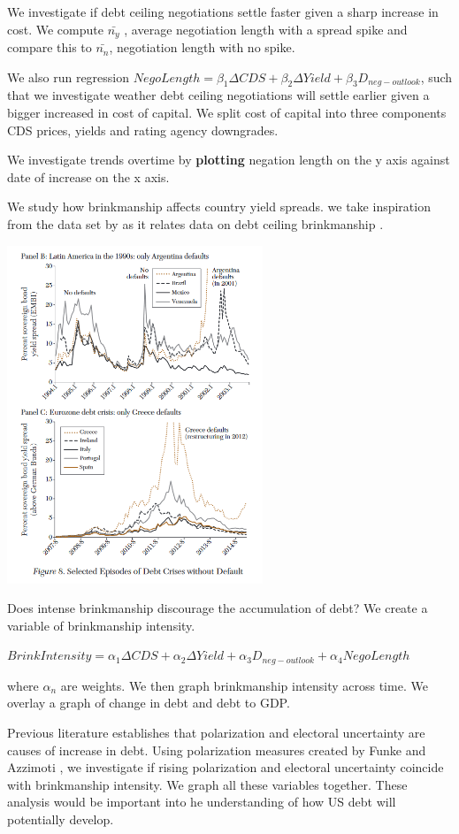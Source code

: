 \documentclass[
  12pt]{article}
\begin{document}
We investigate if debt ceiling negotiations settle faster given a sharp
increase in cost. We compute \(\bar{n_{y}}\) , average negotiation
length with a spread spike and compare this to \(\bar{n_{n}}\),
negotiation length with no spike.

We also run regression
\(NegoLength=\beta_1\Delta CDS+\beta_2\Delta Yield+\beta_3D_{neg-outlook}\),
such that we investigate weather debt ceiling negotiations will settle
earlier given a bigger increased in cost of capital. We split cost of
capital into three components CDS prices, yields and rating agency
downgrades.

We investigate trends overtime by \textbf{plotting} negation length on
the y axis against date of increase on the x axis.

We study how brinkmanship affects country yield spreads. we take
inspiration from the data set by \citep{meyer2022} as it relates data on
debt ceiling brinkmanship \citep{reinhart2008}.

\includegraphics[width=3.01042in,height=\textheight]{style-guide/overtime_brink_2.png}

Does intense brinkmanship discourage the accumulation of debt? We create
a variable of brinkmanship intensity.

\(BrinkIntensity=\alpha_1\Delta CDS+\alpha_2\Delta Yield+\alpha_3D_{neg-outlook}+\alpha_4NegoLength\)

where \(\alpha_n\) are weights. We then graph brinkmanship intensity
across time. We overlay a graph of change in debt and debt to GDP.

Previous literature establishes that polarization and electoral
uncertainty are causes of increase in debt. Using polarization measures
created by Funke and Azzimoti \citep{funke2016, azzimonti2018}, we
investigate if rising polarization and electoral uncertainty coincide
with brinkmanship intensity. We graph all these variables together.
These analysis would be important into he understanding of how US debt
will potentially develop.
\end{document}
